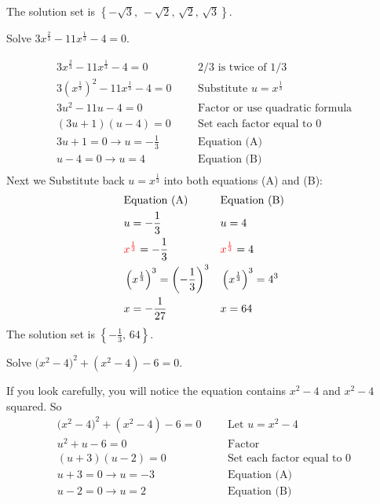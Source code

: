 The solution set is $\left\{ -\sqrt{3},\, -\sqrt{2},\, \sqrt{2},\, \sqrt{3}\right\}$.
\vspace{0.3cm}
\begin{exa}
        Solve $3x^{\frac{2}{3}}-11x^{\frac{1}{3}}-4=0$.
\end{exa}
\begin{align*}
    3x^{\frac{2}{3}}-11x^{\frac{1}{3}}-4=0& &   
    &\text{2/3 is twice of 1/3}\\
    3(x^{\frac{1}{3}})^2-11x^{\frac{1}{3}}-4=0& &
    &\text{Substitute $u=x^{\frac{1}{3} }$}\\
    3u^2-11u-4=0&   &   &\text{Factor or use quadratic formula}\\
    (3u+1)(u-4)=0&  &   &\text{Set each factor equal to 0}\\
    3u+1=0 \rightarrow \boxed{u=-\frac{1}{3}}&  &   &\text{Equation (A)} \\
    u-4=0 \rightarrow \boxed{u=4}&  &   & \text{Equation (B)}\\
\end{align*}
Next we Substitute back $\displaystyle u=x^{ \frac{1}{3} }$ into both equations (A) and (B):
\begin{align*}
    &\text{Equation (A)}    &   &\text{Equation (B)}\\
    &u=-\frac{1}{3}         &   &u=4\\
    &\textcolor{red}{x^{\frac{1}{3}}}=-\frac{1}{3}  &   
    &\textcolor{red}{x^{ \frac{1}{3} }}=4\\
    &\left(x^{ \frac{1}{3} }\right)^3=\left(-\frac{1}{3}\right)^3
    &   &\left(x^{ \frac{1}{3} }\right)^3=4^{3}\\
    &x=-\frac{1}{27}    &   &x=64
\end{align*}
The solution set is $\left\{-\frac{1}{3},\,64 \right\}$.
\begin{exa}
        Solve $\bigl(x^2-4\bigr)^2+(x^2-4)-6=0$.
\end{exa}
If you look carefully, you will notice the equation contains $x^2-4$ and $x^2-4$ squared. So
\begin{align*}
    \bigl(x^2-4\bigr)^2+(x^2-4)-6=0&    &   
    &\text{Let $u=x^2-4$}\\
    u^2+u-6=0&  &   &\text{Factor}\\
    (u+3)(u-2)=0&   &   &\text{Set each factor equal to 0}\\
    u+3=0 \rightarrow \boxed{u=-3}& &&\text{Equation (A)}\\
    u-2=0  \rightarrow  \boxed{u=2}&    &&\text{Equation (B)}
\end{align*}
